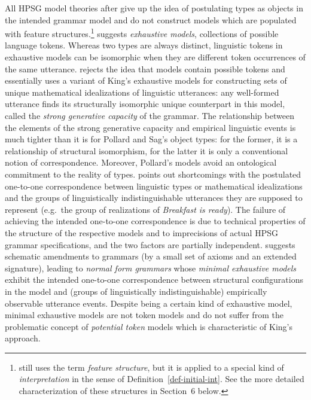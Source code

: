 \documentclass[output=paper
                ,modfonts
                ,nonflat
	        ,collection
	        ,collectionchapter
	        ,collectiontoclongg
 	        ,biblatex
                ,babelshorthands
                ,newtxmath
                ,draftmode
                ,colorlinks, citecolor=brown
]{./langsci/langscibook}
\begin{document}
{{All HPSG
model theories after \cite{PollardSag1994} give up the idea of
postulating types as objects in the intended
grammar model and do not construct models which are populated with feature
structures.\footnote{\cite[294]{Pollard99a} still uses the term \emph{feature
    structure}, but it is applied to a special kind of \emph{interpretation}
  in the sense of Definition~\ref{def-initial-int}. See the
  more detailed characterization of these structures in Section~6 below.} \citet{King99a-u} suggests \emph{exhaustive models},
collections of possible language tokens. Whereas two types are always
distinct, linguistic tokens in
exhaustive models can be isomorphic when they are different token
occurrences of the same utterance. \citet{Pollard99a} rejects the idea
that models contain possible tokens and essentially uses a variant of
King's exhaustive models for constructing sets of unique mathematical
idealizations of linguistic utterances: any well-formed utterance
finds its structurally isomorphic unique counterpart in this model,
called the \emph{strong generative capacity} of the grammar. The
relationship between the elements of the strong generative capacity
and empirical linguistic events is much tighter than it is for
Pollard and Sag's object types: for the former, it is a relationship
of structural isomorphism, for the latter it is only a conventional
notion of correspondence. Moreover, Pollard's models avoid an
ontological commitment to the reality of types. \citet{Richter2007a}
points out shortcomings with the postulated one-to-one correspondence
between linguistic types \citep{PollardSag1994} or mathematical
idealizations \citep{Pollard99a} and the groups of
linguistically indistinguishable utterances they
are supposed to represent (e.g.\ the group of realizations of
\emph{Breakfast is ready}). The failure of achieving the intended
one-to-one correspondence
is due to technical properties of the structure of the respective models
and to imprecisions of actual HPSG grammar
specifications, and the two factors are partially
independent. \citet{Richter2007a} suggests schematic amendments to
grammars (by a small set of axioms and an extended signature),
leading to \emph{normal form grammars} whose \emph{minimal exhaustive
  models} exhibit the intended one-to-one correspondence
between structural configurations in the model and (groups of linguistically
indistinguishable) empirically
observable utterance events. Despite being a certain kind of
exhaustive model, minimal exhaustive models are not token models and
do not suffer from the problematic concept of \emph{potential token} models
which is characteristic of King's approach.

}}
\end{document}
